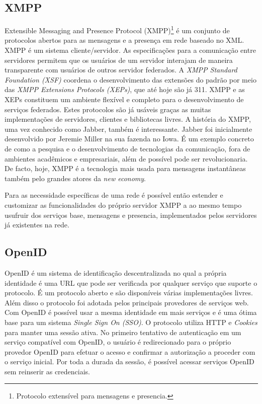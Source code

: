 \subsection{XMPP}
Extensible Messaging and Presence Protocol (XMPP)\footnote{Protocolo
  extensível para mensagens e presencia.} é um conjunto de protocolos
abertos para as mensagens e a presença em rede baseado no XML. XMPP é
um sistema cliente/servidor. As especificações para a comunicação
entre servidores permitem que os usuários de um servidor interajam de
maneira transparente com usuários de outros servidor federados. A
\emph{XMPP Standard Foundation (XSF)} coordena o desenvolvimento das
extensões do padrão por meio das \emph{XMPP Extensions Protocols
  (XEPs)}, que até hoje são já 311. XMPP e as XEPs constituem um
ambiente flexível e completo para o desenvolvimento de serviços
federados. Estes protocolos são já usáveis graças as muitas
implementações de servidores, clientes e bibliotecas livres. A
história do XMPP, uma vez conhecido como Jabber, também é
interessante. Jabber foi inicialmente desenvolvido por Jeremie Miller
na sua fazenda no Iowa. É um exemplo concreto de como a pesquisa e o
desenvolvimento de tecnologias da comunicação, fora de ambientes
acadêmicos e empresariais, além de possível pode ser
revolucionaria. De facto, hoje, XMPP é a tecnologia mais usada para
mensagens instantâneas também pelo grandes atores da \emph{new economy}.

Para as necessidade específicas de uma rede é possível então estender
e customizar as funcionalidades do próprio servidor XMPP a ao mesmo
tempo usufruir dos serviços base, mensagens e presencia, implementados
pelos servidores já existentes na rede. 

\subsection{OpenID}
OpenID é um sistema de identificação descentralizada no qual a própria
identidade é uma URL que pode ser verificada por qualquer serviço que
suporte o protocolo. É um protocolo aberto e são disponíveis várias
implementações livres. Além disso o protocolo foi adotada pelos
principais provedores de serviços web. Com OpenID é possível usar a
mesma identidade em mais serviços e é uma ótima base para um sistema
\emph{Single Sign On (SSO)}. O protocolo utiliza HTTP e \emph{Cookies}
para manter uma sessão ativa. No primeiro tentativo de autenticação em
um serviço compatível com OpenID, o usuário é redirecionado para o
próprio provedor OpenID para efetuar o acesso e confirmar a
autorização a proceder com o serviço inicial. Por toda a durada da
sessão, é possível acessar serviços OpenID sem reinserir as
credenciais. 

